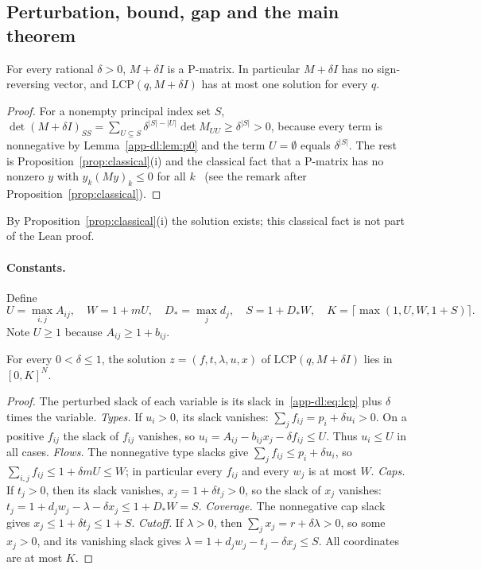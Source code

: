 \subsection{Perturbation, bound, gap and the main theorem}\label{app-dl:sec:main}

\begin{lemma}\label{app-dl:lem:pmatrix}
\statuslean
For every rational $\delta>0$, $M+\delta I$ is a P-matrix. In particular
$M+\delta I$ has no sign-reversing vector, and $\mathrm{LCP}(q,M+\delta I)$ has at most one solution for every $q$.
\end{lemma}

\begin{proof}
For a nonempty principal index set $S$,
$\det(M+\delta I)_{SS}=\sum_{U\subseteq S}\delta^{|S|-|U|}\det M_{UU}\ge\delta^{|S|}>0$, because every
term is nonnegative by Lemma~\ref{app-dl:lem:p0} and the term $U=\emptyset$ equals $\delta^{|S|}$. The
rest is Proposition~\ref{prop:classical}(i) and the classical fact that a P-matrix has no nonzero $y$
with $y_k(My)_k\le0$ for all $k$~\cite{cps92} (see the remark after Proposition~\ref{prop:classical}).
\end{proof}

By Proposition~\ref{prop:classical}(i) the solution exists; this classical fact is not part of the Lean proof.

\paragraph{Constants.} Define
\[
  U=\max_{i,j}A_{ij},\quad W=1+mU,\quad D_*=\max_jd_j,\quad S=1+D_*W,\quad
  K=\bigl\lceil\max(1,U,W,1+S)\bigr\rceil .
\]
Note $U\ge1$ because $A_{ij}\ge1+b_{ij}$.

\begin{lemma}\label{app-dl:lem:bound}
\statuslean
For every $0<\delta\le1$, the solution $z=(f,t,\lambda,u,x)$ of $\mathrm{LCP}(q,M+\delta I)$ lies in
$[0,K]^N$.
\end{lemma}

\begin{proof}
The perturbed slack of each variable is its slack in~\eqref{app-dl:eq:lcp} plus $\delta$ times the
variable. \emph{Types.} If $u_i>0$, its slack vanishes: $\sum_jf_{ij}=p_i+\delta u_i>0$. On a positive
$f_{ij}$ the slack of $f_{ij}$ vanishes, so $u_i=A_{ij}-b_{ij}x_j-\delta f_{ij}\le U$. Thus $u_i\le U$ in
all cases. \emph{Flows.} The nonnegative type slacks give $\sum_jf_{ij}\le p_i+\delta u_i$, so
$\sum_{i,j}f_{ij}\le1+\delta mU\le W$; in particular every $f_{ij}$ and every $w_j$ is at most $W$.
\emph{Caps.} If $t_j>0$, then its slack vanishes, $x_j=1+\delta t_j>0$, so the slack of $x_j$ vanishes:
$t_j=1+d_jw_j-\lambda-\delta x_j\le1+D_*W=S$. \emph{Coverage.} The nonnegative cap slack gives
$x_j\le1+\delta t_j\le1+S$. \emph{Cutoff.} If $\lambda>0$, then $\sum_jx_j=r+\delta\lambda>0$, so some
$x_j>0$, and its vanishing slack gives $\lambda=1+d_jw_j-t_j-\delta x_j\le S$. All coordinates are at most
$K$.
\end{proof}

